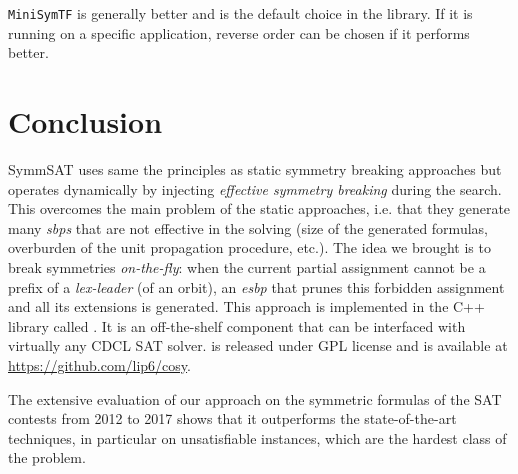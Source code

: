 \texttt{MiniSymTF} is generally better and is the default choice in the library.
If it is running on a specific application, reverse order can be chosen if it performs better.


\section{Conclusion}
SymmSAT uses same the principles as static symmetry breaking approaches but operates dynamically by 
injecting \textit{effective symmetry breaking} during the search.
This overcomes the main problem of the static approaches, i.e. that they
generate many \textit{sbps} that are not effective in the solving (size of the
generated formulas, overburden of the unit propagation procedure, etc.).
The idea we brought is to break symmetries \emph{on-the-fly}: when the current
partial assignment cannot be a prefix of a \textit{lex-leader} (of an orbit),
an \textit{esbp} that prunes this forbidden assignment and all its extensions is generated. 
This approach is implemented in the C++ library called \libdsb{}. It is an
off-the-shelf component that can be interfaced with virtually any CDCL SAT
solver. \libdsb{} is released under GPL license and is available at
\url{https://github.com/lip6/cosy}.
 
The extensive evaluation of our approach on the symmetric formulas of the 
 SAT contests from 2012 to 2017 shows that it outperforms the state-of-the-art techniques, in
particular on unsatisfiable instances, which are the hardest class of the
problem.